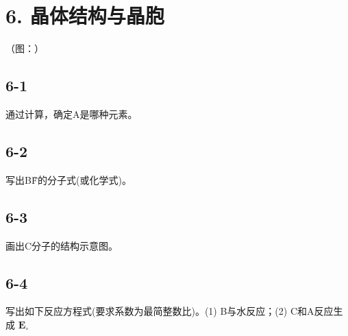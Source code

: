\section*{6. 晶体结构与晶胞}
（图：）

\subsection*{6-1}
通过计算，确定A是哪种元素。

\subsection*{6-2}
写出B\~F的分⼦式(或化学式)。

\subsection*{6-3}
画出C分⼦的结构⽰意图。

\subsection*{6-4}
写出如下反应⽅程式(要求系数为最简整数⽐)。(1) B与⽔反应；(2) C和A反应⽣成 $\mathbf { E } _ { \circ }$
